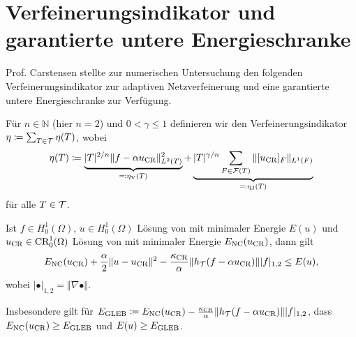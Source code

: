 \section{Verfeinerungsindikator und garantierte untere Energieschranke}
Prof. Carstensen stellte zur numerischen Untersuchung den folgenden
Verfeinerungsindikator zur adaptiven Netzverfeinerung  und eine 
garantierte untere Energieschranke zur Verfügung.

\begin{definition}[Verfeinerungsindikator]\label{def:refinementIndicator}
  Für $n\in\mathbb{N}$ (hier $n=2$) und $0<\gamma\leq 1$ definieren wir den
  Verfeinerungsindikator $\eta\coloneqq\sum_{T\in\mathcal{T}}\eta(T)$, wobei
  \begin{align} \label{eq:refinementIndicator} 
    \eta (T)\coloneqq
    \underbrace{|T|^{2/n}\Vert f-\alpha u_\textup{CR}\Vert^2_{L^2(T)}}_{\eqqcolon
    \eta_\text{V}(T)} +\underbrace{|T|^{\gamma/n}\sum_{F\in\mathcal{F}(T)}\Vert
    [u_\textup{CR}]_F\Vert_{L^1(F)}}_{ \eqqcolon \eta_\text{J}(T)} 
  \end{align} 
  für alle $T\in\mathcal{T}$.
\end{definition}

\begin{theorem}
  \label{thm:gleb}
  Ist $f\in H^1_0(\Omega)$, $u\in H^1_0(\Omega)$ Lösung von
   mit minimaler Energie $E(u)$ und $u_\textup{CR}\in
  \textup{CR}^1_0(\Omega)$ Lösung von  mit minimaler Energie
  $E_\textup{NC}(u_\textup{CR})$, dann gilt
  \begin{align}
    \label{eq:gleb}
    E_\textup{NC}(u_\textup{CR})+\frac{\alpha}{2}\Vert u-u_\textup{CR}\Vert^2
    -\frac{\kappa_{\textup{CR}}}{\alpha}\Vert
    h_{\mathcal{T}}(f-\alpha u_\textup{CR})\Vert |f|_{1,2}\leq E(u),
  \end{align}
  wobei $|\bullet|_{1,2}=\Vert\nabla \bullet\Vert$.
  
  Insbesondere gilt für 
  $E_\textup{GLEB} \coloneqq 
    E_\textup{NC}(u_\textup{CR}) - \frac{\kappa_{\textup{CR}}}{\alpha}\Vert
    h_{\mathcal{T}}(f-\alpha u_\textup{CR})\Vert |f|_{1,2}$, dass
    $E_\textup{NC}(u_\textup{CR})\geq E_\textup{GLEB}$ und $E(u)\geq E_\textup{GLEB}$.
\end{theorem}
